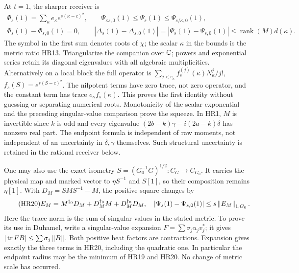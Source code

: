 At \(t=1\), the sharper receiver is
\begin{equation}\tag{HR19}\label{hrv:HR19}
\begin{gathered}
\Phi_s(1)=\sum_\kappa e_\kappa e^{s(\kappa-c)^2},\qquad
\Psi_{\kappa s,0}(1)\le\Psi_s(1)\le\Psi_{s/\kappa,0}(1),\\
\Phi_s(1)-\Phi_{s,0}(1)=0,\qquad
|\Delta_s(1)-\Delta_{s,0}(1)|
=|\Psi_s(1)-\Psi_{s,0}(1)|\le \operatorname{rank}(M)d(\kappa).
\end{gathered}
\end{equation}
The symbol in the first sum denotes roots of \(\chi\); the scalar
\(\kappa\) in the bounds is the metric ratio HR13. Triangularize
the companion over \(\mathbb C\); powers and exponential series retain its
diagonal eigenvalues with all algebraic multiplicities. Alternatively
on a local block the full operator is
\(\sum_{j<e_\kappa}f_s^{(j)}(\kappa)N_\kappa^j/j!\),
\(f_s(S)=e^{s(S-c)^2}\). The nilpotent terms have zero trace, not
zero operator, and the constant term has trace
\(e_\kappa f_s(\kappa)\). This proves the first identity without
guessing or separating numerical roots. Monotonicity of the scalar
exponential and the preceding singular-value comparison prove the
squeeze. In HR1, \(M\) is invertible since \(k\) is odd and every
eigenvalue \((2b-k)\gamma-i(2a-k)\delta\) has nonzero real part.
The endpoint formula is independent of raw moments, not independent
of an uncertainty in \(\delta,\gamma\) themselves. Such structural
uncertainty is retained in the rational receiver below.

One may also use the exact isometry
\(S=(G_0^{-1}G)^{1/2}:C_G\to C_{G_0}\). It carries the physical
map and marked vector to \(\eta S^{-1}\) and \(S[1]\), so their
composition remains \(\eta[1]\). With \(D_M=SMS^{-1}-M\), the
positive square changes by
\begin{equation}\tag{HR20}\label{hrv:HR20}
E_M=M^{\dagger_0}D_M+D_M^{\dagger_0}M+D_M^{\dagger_0}D_M,
\quad |\Psi_s(1)-\Psi_{s,0}(1)|\le s\left\lVert E_M\right\rVert_{1,G_0}.
\end{equation}
Here the trace norm is the sum of singular values in the stated
metric. To prove its use in Duhamel, write a singular-value expansion
\(F=\sum\sigma_j u_jv_j^*\); it gives
\(|\operatorname{tr} FB|\le\sum\sigma_j\left\lVert B\right\rVert\). Both positive heat factors
are contractions. Expansion gives exactly the three terms in HR20,
including the quadratic one. In particular the endpoint radius may
be the minimum of HR19 and HR20. No change of metric scale has occurred.

